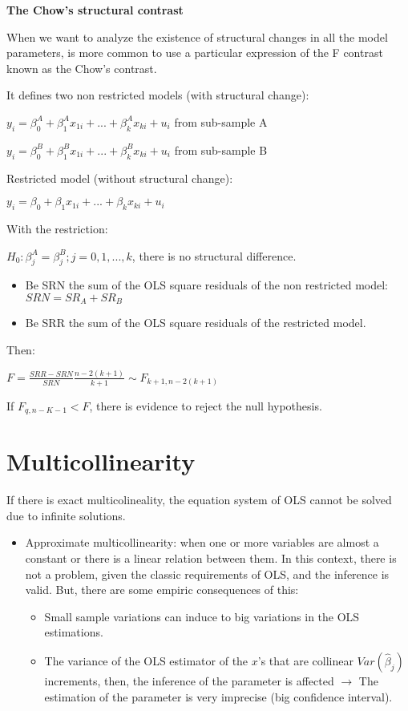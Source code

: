\documentclass[10pt,landscape]{article}
\begin{document}
\begin{multicols}{3}
\textbf{The Chow's structural contrast}

When we want to analyze the existence of structural changes in all the model parameters, is more common to use a particular expression of the F contrast known as the Chow's contrast.

It defines two non restricted models (with structural change):

$y_i = \beta_0^A + \beta_1^A x_{1i} + ... + \beta_k^A x_{ki} + u_i$ from sub-sample A

$y_i = \beta_0^B + \beta_1^B x_{1i} + ... + \beta_k^B x_{ki} + u_i$ from sub-sample B

Restricted model (without structural change):

$y_i = \beta_0 + \beta_1 x_{1i} + ... + \beta_k x_{ki} + u_i$

With the restriction:

$H_0: \beta_j^A = \beta_j^B; j=0,1,...,k$, there is no structural difference.

\begin{itemize}[leftmargin=*]
\item Be SRN the sum of the OLS square residuals of the non restricted model: $SRN = SR_A + SR_B$
\item Be SRR the sum of the OLS square residuals of the restricted model.
\end{itemize}

Then:

$F = \frac{SRR - SRN}{SRN} \frac{n-2(k+1)}{k+1} \sim F_{k+1,n-2(k+1)}$

If $F_{q, n-K-1} < F$, there is evidence to reject the null hypothesis.

\section*{Multicollinearity}

If there is exact multicolineality, the equation system of OLS cannot be solved due to infinite solutions.

\begin{itemize}[leftmargin=*]
\item Approximate multicollinearity: when one or more variables are almost a constant or there is a linear relation between them. In this context, there is not a problem, given the classic requirements of OLS, and the inference is valid. But, there are some empiric consequences of this:
\begin{itemize}[leftmargin=*]
\item Small sample variations can induce to big variations in the OLS estimations.
\item The variance of the OLS estimator of the $x$'s that are collinear $Var(\hat{\beta}_j)$ increments, then, the inference of the parameter is affected $\rightarrow$ The estimation of the parameter is very imprecise (big confidence interval).
\end{itemize}
\end{itemize}


\end{multicols}
\end{document}
